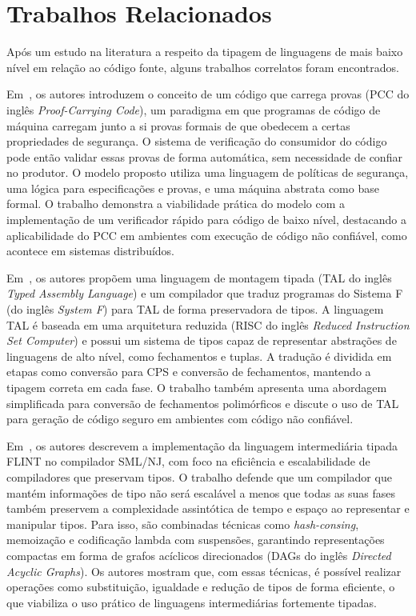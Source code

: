 \section{Trabalhos Relacionados}
Após um estudo na literatura a respeito da tipagem de linguagens de mais baixo nível em relação ao código fonte, alguns trabalhos correlatos foram encontrados.

Em~\cite{necula1997pcc}, os autores introduzem o conceito de um código que carrega provas (PCC do inglês \textit{Proof-Carrying Code}), um paradigma em que programas de código de máquina carregam junto a si provas formais de que obedecem a certas propriedades de segurança.
O sistema de verificação do consumidor do código pode então validar essas provas de forma automática, sem necessidade de confiar no produtor.
O modelo proposto utiliza uma linguagem de políticas de segurança, uma lógica para especificações e provas, e uma máquina abstrata como base formal.
O trabalho demonstra a viabilidade prática do modelo com a implementação de um verificador rápido para código de baixo nível, destacando a aplicabilidade do PCC em ambientes com execução de código não confiável, como acontece em sistemas distribuídos.

Em~\cite{morrisett1999systemF}, os autores propõem uma linguagem de montagem tipada (TAL do inglês \textit{Typed Assembly Language}) e um compilador que traduz programas do Sistema F (do inglês \textit{System F}) para TAL de forma preservadora de tipos.
A linguagem TAL é baseada em uma arquitetura reduzida (RISC do inglês \textit{Reduced Instruction Set Computer}) e possui um sistema de tipos capaz de representar abstrações de linguagens de alto nível, como fechamentos e tuplas.
A tradução é dividida em etapas como conversão para CPS e conversão de fechamentos, mantendo a tipagem correta em cada fase.
O trabalho também apresenta uma abordagem simplificada para conversão de fechamentos polimórficos e discute o uso de TAL para geração de código seguro em ambientes com código não confiável.

Em~\cite{shao1998implementing}, os autores descrevem a implementação da linguagem intermediária tipada FLINT no compilador SML/NJ, com foco na eficiência e escalabilidade de compiladores que preservam tipos.
O trabalho defende que um compilador que mantém informações de tipo não será escalável a menos que todas as suas fases também preservem a complexidade assintótica de tempo e espaço ao representar e manipular tipos.
Para isso, são combinadas técnicas como \textit{hash-consing}, memoização e codificação lambda com suspensões, garantindo representações compactas em forma de grafos acíclicos direcionados (DAGs do inglês \textit{Directed Acyclic Graphs}).
Os autores mostram que, com essas técnicas, é possível realizar operações como substituição, igualdade e redução de tipos de forma eficiente, o que viabiliza o uso prático de linguagens intermediárias fortemente tipadas.

